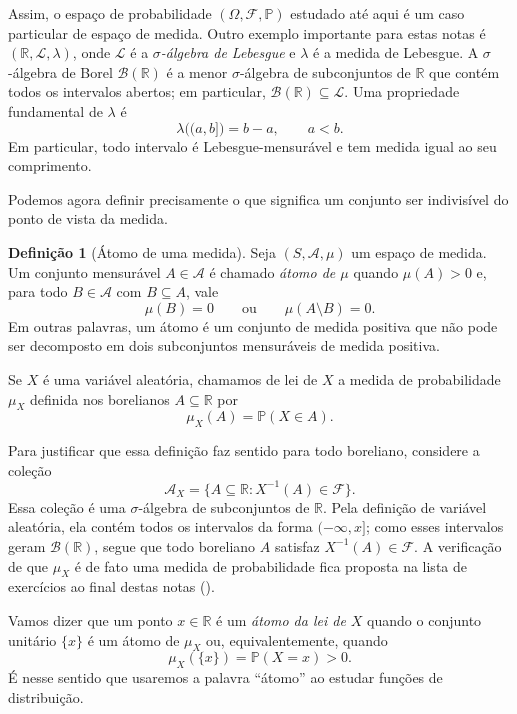\documentclass[12pt,portuguese]{article}
\theoremstyle{definition}
\newtheorem{definition}[definition]{Definição}
\theoremstyle{plainexercise}
\theoremstyle{starredexercise}
\theoremstyle{definition}
\begin{document}
Assim, o espaço de probabilidade $(\Omega,\mathcal{F},\mathbb{P})$ estudado
até aqui é um caso particular de espaço de medida. Outro exemplo importante
para estas notas é $(\mathbb{R},\mathcal{L},\lambda)$, onde $\mathcal{L}$ é a
\emph{$\sigma$-álgebra de Lebesgue} e $\lambda$ é a medida de Lebesgue. A
$\sigma$-álgebra de Borel $\mathscr{B}(\mathbb{R})$ é a menor
$\sigma$-álgebra de subconjuntos de $\mathbb{R}$ que contém todos os
intervalos abertos; em particular,
$\mathscr{B}(\mathbb{R})\subseteq\mathcal{L}$. Uma propriedade fundamental
de $\lambda$ é
\[
  \lambda\bigl((a,b]\bigr)=b-a, \qquad a<b.
\]
Em particular, todo intervalo é Lebesgue-mensurável e tem medida igual ao seu
comprimento.


Podemos agora definir precisamente o que significa um conjunto
ser indivisível do ponto de vista da medida.

\begin{definition}[Átomo de uma medida]
Seja $(S,\mathcal{A},\mu)$ um espaço de medida. Um conjunto mensurável
$A\in\mathcal{A}$ é chamado \emph{átomo de $\mu$} quando
$\mu(A)>0$ e, para todo $B\in\mathcal{A}$ com $B\subseteq A$, vale
\[
  \mu(B)=0 \qquad\text{ou}\qquad \mu(A\setminus B)=0.
\]
Em outras palavras, um átomo é um conjunto de medida positiva que não pode ser
decomposto em dois subconjuntos mensuráveis de medida positiva.
\end{definition}

Se $X$ é uma variável aleatória, chamamos de lei de $X$ a medida de probabilidade
$\mu_X$ definida nos borelianos $A\subseteq\mathbb{R}$ por
\[
  \mu_X(A)=\mathbb{P}(X\in A).
\]

Para justificar que essa definição faz sentido para todo boreliano, considere
a coleção
\[
  \mathcal{A}_X
  =\{A\subseteq\mathbb{R}:X^{-1}(A)\in\mathcal{F}\}.
\]
Essa coleção é uma $\sigma$-álgebra de subconjuntos de $\mathbb{R}$. Pela
definição de variável aleatória, ela contém todos os intervalos da forma
$(-\infty,x]$; como esses intervalos geram $\mathscr{B}(\mathbb{R})$, segue
que todo boreliano $A$ satisfaz $X^{-1}(A)\in\mathcal{F}$. A verificação de
que $\mu_X$ é de fato uma medida de probabilidade fica proposta na lista de
exercícios ao final destas notas ().

Vamos dizer que um ponto $x\in\mathbb{R}$ é um \emph{átomo da lei de
$X$} quando o conjunto unitário $\{x\}$ é um átomo de $\mu_X$ ou, equivalentemente, quando
\[
  \mu_X(\{x\})=\mathbb{P}(X=x)>0.
\]
É nesse sentido que usaremos a palavra ``átomo'' ao estudar funções de
distribuição.
\end{document}

